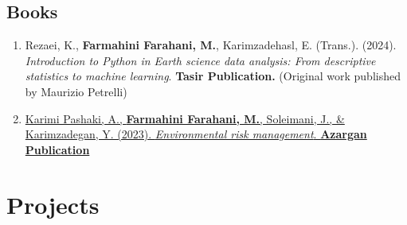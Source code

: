 \documentclass[letterpaper,11pt]{article}
\begin{document}
\begin{justify}
	\subsection*{Books}
	\begin{enumerate}[label=\arabic*.,left=0pt,topsep=7.5pt,partopsep=0pt,itemsep=3.5pt,parsep=0pt]
		\item Rezaei, K., \textbf{Farmahini Farahani, M.}, Karimzadehasl, E. (Trans.). (2024). \textit{Introduction to Python in Earth science data analysis: From descriptive statistics to machine learning}. \textbf{Tasir Publication.} (Original work published by Maurizio Petrelli)
		\item \href{https://www.researchgate.net/publication/374919527_Environmental_Risk_Management}{Karimi Pashaki, A., \textbf{Farmahini Farahani, M.}, Soleimani, J., \& Karimzadegan, Y. (2023). \textit{Environmental risk management}. \textbf{Azargan Publication}} 
	\end{enumerate}
\end{justify}


\section{Projects}
\end{document}
